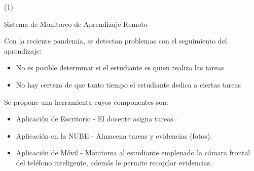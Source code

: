 
\begin{frame}{ \footnotemark (1)}
\begin{block}{Sistema de Monitoreo de Aprendizaje Remoto } 

Con la reciente pandemia, se detectan problemas con el seguimiento del aprendizaje:

	\begin{itemize}
		\item No es posible determinar si el estudiante es quien realiza las tareas
		\item No hay certeza de que tanto tiempo el estudiante dedica a ciertas tareas
	\end{itemize}

Se propone una herramienta cuyos componentes son:
\begin{itemize}
\item Aplicación de Escritorio - El docente asigna tareas·
\item Aplicación en la NUBE - Almacena tareas y evidencias (fotos).
\item Aplicación de Móvil - Monitorea al estudiante emplenado la cámara frontal del teléfono inteligente, además le permite recopilar evidencias.
\end{itemize}
\end{block} 
\setcounter{footnote}{0}
\end{frame}

